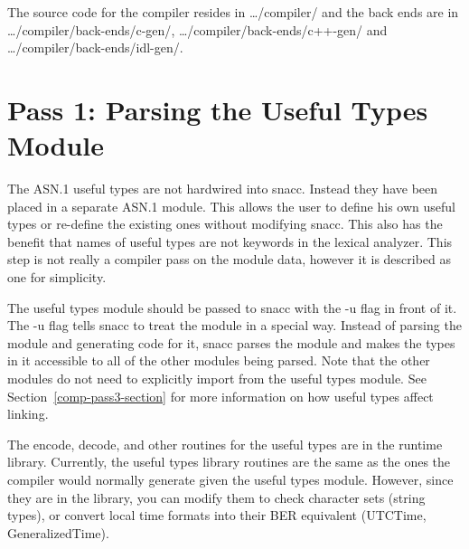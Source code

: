 The source code for the compiler resides in {\ufn \dots/compiler/} and the
back ends are in {\ufn \dots/compiler/back-ends/c-gen/}, {\ufn \dots/compiler/back-ends/c++-gen/} and {\ufn \dots/compiler/back-ends/idl-gen/}.

\section{\label{comp-pass1-section}Pass 1: Parsing the Useful Types Module}
The ASN.1 useful types are not hardwired into snacc.  Instead they
have been placed in a separate ASN.1 module.  This allows the user to
define his own useful types or re-define the existing ones without
modifying snacc.  This also has the benefit that names of useful types
are not keywords in the lexical analyzer.  This step is not really a
compiler pass on the module data, however it is described as one for
simplicity.

The useful types module should be passed to snacc with the {\ufn -u}
flag in front of it.  The {\ufn -u} flag tells snacc to treat the
module in a special way.  Instead of parsing the module and generating
code for it, snacc parses the module and makes the types in it
accessible to all of the other modules being parsed.  Note that the
other modules do not need to explicitly import from the useful types
module.  See Section~\ref{comp-pass3-section} for more information on how
useful types affect linking.

The encode, decode, and other routines for the useful types are in the
runtime library.  Currently, the useful types library routines are the
same as the ones the compiler would normally generate given the useful
types module.  However, since they are in the library, you can modify
them to check character sets (string types), or convert local time
formats into their BER equivalent (UTCTime, GeneralizedTime).

